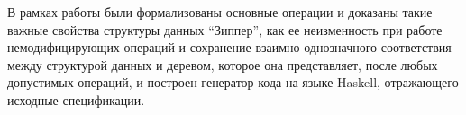 В рамках работы были формализованы основные операции и доказаны такие важные свойства структуры данных ``Зиппер'', как ее неизменность при работе немодифицирующих операций и сохранение взаимно-однозначного соответствия между структурой данных и деревом, которое она представляет, после любых допустимых операций, и построен генератор кода на языке Haskell, отражающего исходные спецификации.

\newpage

\printbibliography[%
    heading=bibintoc%
]

\appendix
{}


